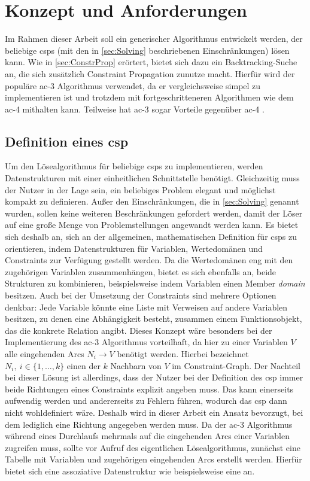 \section{Konzept und Anforderungen}
Im Rahmen dieser Arbeit soll ein generischer Algorithmus entwickelt werden, der beliebige \acp{csp} (mit den in \cref{sec:Solving} beschriebenen Einschränkungen) lösen kann. Wie in
\cref{sec:ConstrProp} erörtert, bietet sich dazu ein Backtracking-Suche an, die sich zusätzlich Constraint Propagation zunutze macht. Hierfür wird der populäre \ac*{ac}-3
Algorithmus verwendet, da er vergleichsweise simpel zu implementieren ist und trotzdem mit fortgeschritteneren Algorithmen wie dem \ac*{ac}-4 mithalten kann. Teilweise hat
\ac*{ac}-3 sogar Vorteile gegenüber \ac*{ac}-4 \cite{ACAgain}.

\subsection{Definition eines \ac*{csp}}
Um den Lösealgorithmus für beliebige \acp{csp} zu implementieren, werden Datenstrukturen mit einer einheitlichen Schnittstelle benötigt. Gleichzeitig muss der Nutzer in der Lage
sein, ein beliebiges Problem elegant und möglichst kompakt zu definieren. Außer den Einschränkungen, die in \cref{sec:Solving} genannt wurden, sollen keine weiteren Beschränkungen
gefordert werden, damit der Löser auf eine große Menge von Problemstellungen angewandt werden kann. Es bietet sich deshalb an, sich an der allgemeinen, mathematischen Definition
für \acp{csp} zu orientieren, indem Datenstrukturen für Variablen, Wertedomänen und Constraints zur Verfügung gestellt werden. Da die Wertedomänen eng mit den zugehörigen Variablen
zusammenhängen, bietet es sich ebenfalls an, beide Strukturen zu kombinieren, beispielsweise indem Variablen einen Member \textit{domain} besitzen. Auch bei der Umsetzung der
Constraints sind mehrere Optionen denkbar: Jede Variable könnte eine Liste mit Verweisen auf andere Variablen besitzen, zu denen eine Abhängigkeit besteht, zusammen einem
Funktionsobjekt, das die konkrete Relation angibt. Dieses Konzept wäre besonders bei der Implementierung des \ac*{ac}-3 Algorithmus vorteilhaft, da hier zu einer Variablen $V$ alle
eingehenden Arcs $N_i \rightarrow V$ benötigt werden. Hierbei bezeichnet $N_i, \ i \in \{1, \dots, k\}$ einen der $k$ Nachbarn von $V$ im Constraint-Graph. Der Nachteil bei dieser
Lösung ist allerdings, dass der Nutzer bei der Definition des \ac*{csp} immer beide Richtungen eines Constraints explizit angeben muss. Das kann einerseits aufwendig werden und
andererseits zu Fehlern führen, wodurch das \ac*{csp} dann nicht wohldefiniert wäre. Deshalb wird in dieser Arbeit ein Ansatz bevorzugt, bei dem lediglich eine Richtung angegeben
werden muss. Da der \ac*{ac}-3 Algorithmus während eines Durchlaufs mehrmals auf die eingehenden Arcs einer Variablen zugreifen muss, sollte vor Aufruf des eigentlichen
Lösealgorithmus, zunächst eine Tabelle mit Variablen und zugehörigen eingehenden Arcs erstellt werden. Hierfür bietet sich eine assoziative Datenstruktur wie beispielsweise eine
 an.
